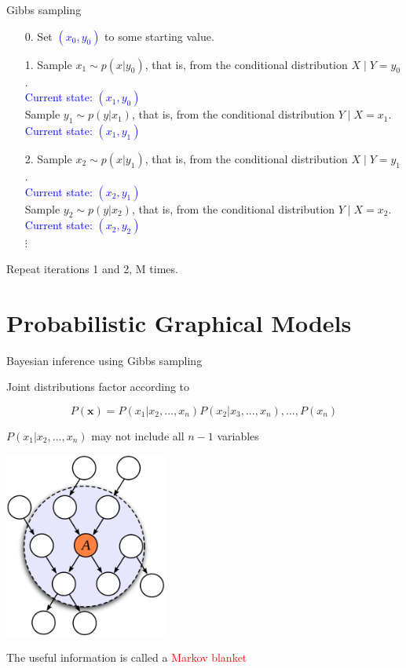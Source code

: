 \documentclass{beamer}					%
\begin{document}
\begin{frame}{Gibbs sampling}
\begin{enumerate}
\item[0.] Set \textcolor{blue}{$(x_0,y_0)$} to some starting value.
\item[1.] Sample $x_1\sim p(x|y_0)$, that is, from the conditional distribution $X\mid Y=y_0$. \\
\textcolor{blue}{Current state: $(x_1, y_0)$}\\
          Sample $y_1\sim p(y|x_1)$, that is, from the conditional distribution $Y\mid X=x_1$.\\
    \textcolor{blue}{      Current state: $(x_1, y_1)$}\\
\item[2.] Sample $x_2\sim p(x|y_1)$, that is, from the conditional distribution $X\mid Y=y_1$. \\
    \textcolor{blue}{      Current state: $(x_2, y_1)$}\\
          Sample $y_2\sim p(y|x_2)$, that is, from the conditional distribution $Y\mid X=x_2$. \\
            \textcolor{blue}{      Current state: $(x_2, y_2)$}\\
        $\vdots$
\end{enumerate}
Repeat iterations 1 and 2, M times. 
\end{frame}

\section{Probabilistic Graphical Models}

\begin{frame}{Bayesian inference using Gibbs sampling}

Joint distributions factor according to 

\begin{equation*}
P(\mathbf{x})=P(x_{1}|x_{2},...,x_{n})P(x_{2}|x_{3},...,x_{n}),...,P(x_{n})
\end{equation*}

$P(x_{1}|x_{2},...,x_{n})$ may not include all $n-1$ variables

\begin{center}
\includegraphics[width=0.4\textwidth]{blanket}
\end{center}

The useful information is called a \textcolor{red}{Markov blanket}

\vspace{0.1in}


\end{frame}
\end{document}

